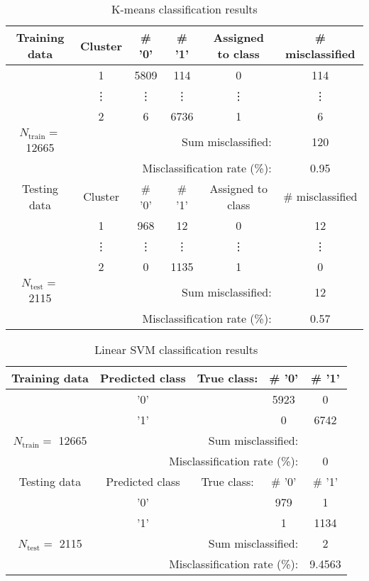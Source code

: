 \documentclass[a4paper,11pt]{article}
\begin{document}
\begin{table}[ht]
\caption{K-means classification results}
\centering
\begin{tabular}{c | c c c c | c }
\hline\hline
Training data & Cluster & \# '0' & \# '1'  & Assigned to class & \# misclassified \\ [0.5ex] %
\hline
& 1 & 5809 & 114 & 0 & 114 \\
& \vdots &  \vdots& \vdots & \vdots  & \vdots \\  
& 2 & 6  & 6736 & 1 & 6\\ 
\hline 
$N_\text{train} = $ 12665  & \multicolumn{4}{r}{Sum misclassified:} & 120 \\ [.5ex]
\hline 
 & \multicolumn{4}{r}{Misclassification rate (\%):} & 0.95\\ [.5ex]
\hline\hline
%
%
Testing data & Cluster & \# '0' & \# '1'  & Assigned to class & \# misclassified \\ [0.5ex] %
\hline
& 1 & 968 & 12 & 0 & 12 \\
& \vdots &  \vdots& \vdots & \vdots  & \vdots \\  
& 2 & 0  & 1135 & 1 & 0\\ 
\hline 
$N_\text{test} = $ 2115  & \multicolumn{4}{r}{Sum misclassified:} & 12 \\ [.5ex]
\hline 
 & \multicolumn{4}{r}{Misclassification rate (\%):} & 0.57\\ [.5ex]
\hline\hline
%
\end{tabular}
\label{table:kmeanstable}
\end{table}
%




\vspace{1em}
\begin{table}[ht]
\caption{Linear SVM classification results}
\centering
\begin{tabular}{c | c | c c c}
\hline\hline
Training data & Predicted class & True class: & \# '0' & \# '1' \\ [0.5ex] %
\hline
& '0' & & 5923 & 0 \\
& '1' & & 0 & 6742\\ 
\hline 
$N_\text{train} = $ 12665  & \multicolumn{3}{r}{Sum misclassified: } 0 ? \\ [.5ex]
\hline 
 & \multicolumn{3}{r}{Misclassification rate (\%):} & 0 \\ [.5ex]
\hline\hline
%
Testing data & Predicted class & True class: & \# '0' & \# '1' \\ [0.5ex] %
\hline
& '0' & & 979 & 1 \\
& '1' & & 1 & 1134\\ 
\hline 
$N_\text{test} = $ 2115  & \multicolumn{3}{r}{Sum misclassified:} & 2  \\ [.5ex]
\hline 
 & \multicolumn{3}{r}{Misclassification rate (\%): } & 9.4563 \\ [.5ex]
\hline\hline
%
\end{tabular}
\label{table:svmtable}
\end{table}
%
\vspace{1em}
\end{document}
